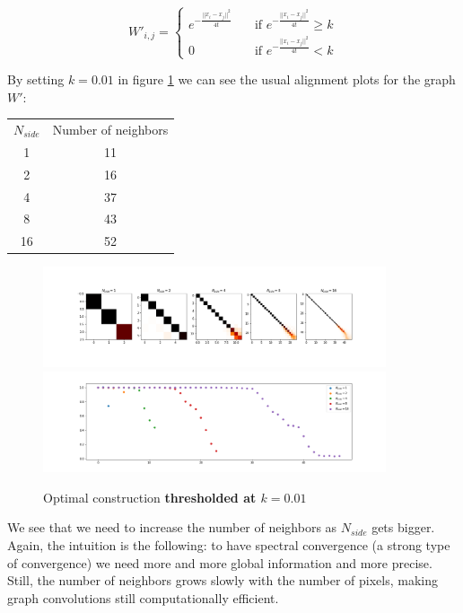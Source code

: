 $$W'_{i,j} = \begin{cases}
e^{-\frac{||x_i-x_j||^2}{4t}}\quad& \text{if } e^{-\frac{||x_i-x_j||^2}{4t}} \geq k\\
0 \quad & \text{if } e^{-\frac{||x_i-x_j||^2}{4t}} < k
\end{cases}$$

By setting $k = 0.01$ in figure \ref{fig:optimal_thresholded} we can see the usual alignment plots for the graph $W'$:

\begin{center}
	\begin{tabular}{ c|c} 
		$N_{side}$ & Number of neighbors \\ 
		1 & 11 \\ 
		2 & 16 \\ 
		4 & 37 \\ 
		8 & 43 \\ 
		16 & 52 \\ 
	\end{tabular}
\end{center}

\begin{figure}[h]
	\centering
	\includegraphics[width=0.9\textwidth]{../codes/02.HeatKernelGraphLaplacian/HEALPix/06_figures/optimal_thresholded.png}	
	\includegraphics[width=0.9\textwidth]{../codes/02.HeatKernelGraphLaplacian/HEALPix/06_figures/optimal_thresholded_diagonal.png}
	\caption{\label{fig:optimal_thresholded}Optimal construction \textbf{thresholded at $k=0.01$}}
\end{figure}

We see that we need to increase the number of neighbors as $N_{side}$ gets bigger. Again, the intuition is the following: to have spectral convergence (a strong type of convergence) we need more and more global information and more precise.  Still, the number of neighbors grows slowly with the number of pixels, making graph convolutions still computationally efficient.

